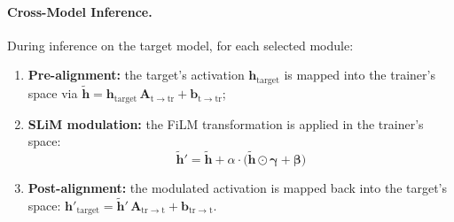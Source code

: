 \paragraph{Cross-Model Inference.}
During inference on the target model, for each selected module:
\begin{enumerate}
    \item \textbf{Pre-alignment:} the target's activation $\mathbf{h}_{\mathrm{target}}$ is mapped into the trainer's space via $\tilde{\mathbf{h}} = \mathbf{h}_{\mathrm{target}}\,\mathbf{A}_{\mathrm{t \to tr}} + \mathbf{b}_{\mathrm{t \to tr}}$;
    \item \textbf{SLiM modulation:} the FiLM transformation is applied in the trainer's space:
    \begin{equation}
    \label{eq:slim_crossmodel}
    \tilde{\mathbf{h}}' = \tilde{\mathbf{h}} + \alpha \cdot \big(\tilde{\mathbf{h}} \odot \boldsymbol{\gamma} + \boldsymbol{\beta}\big)
    \end{equation}
    \item \textbf{Post-alignment:} the modulated activation is mapped back into the target's space: $\mathbf{h}'_{\mathrm{target}} = \tilde{\mathbf{h}}'\,\mathbf{A}_{\mathrm{tr \to t}} + \mathbf{b}_{\mathrm{tr \to t}}$.
\end{enumerate}

